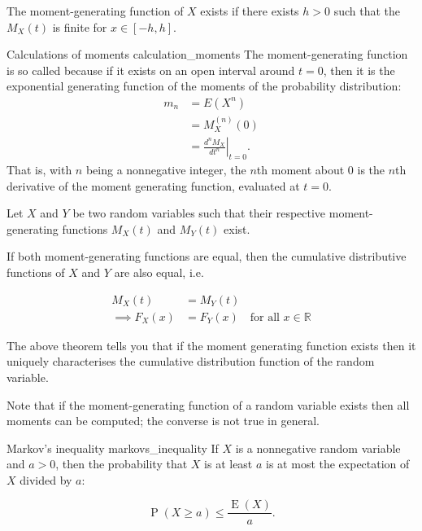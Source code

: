 The moment-generating function of $X$ exists if there exists $h > 0$ such that the $M_X(t)$ is finite for $x \in [-h, h]$.

\begin{lemma}{Calculations of moments \cite{wikipedia_moment_generating_function}}{calculation_moments}
	The moment-generating function is so called because if it exists on an open interval around $t = 0$, then it is the exponential generating function of the moments of the probability distribution:
	\begin{align*}
		m_{n} &= E\left(X^{n}\right) \\
		&= M_{X}^{(n)}(0) \\
		&= \left.{\frac {d^{n}M_{X}}{dt^{n}}}\right|_{t=0} .
	\end{align*}
	That is, with $n$ being a nonnegative integer, the $n$th moment about 0 is the $n$th derivative of the moment generating function, evaluated at $t = 0$.	
\end{lemma}

\begin{theorem}{\cite{math2901_notes}}{}
	Let $X$ and $Y$ be two random variables such that their respective moment-generating functions $M_X(t)$ and $M_Y(t)$ exist.

	If both moment-generating functions are equal, then the cumulative distributive functions of $X$ and $Y$ are also equal, i.e.

	\begin{align*}
		M_X(t) &= M_Y(t) \\
		\implies F_X(x) &= F_Y(x) \quad \text{for all } x \in \mathbb{R}
	\end{align*}
\end{theorem}

The above theorem tells you that if the moment generating
function exists then it uniquely characterises the cumulative
distribution function of the random variable. \cite{math2901_notes}

Note that if the moment-generating function of a random variable exists then all moments can be computed; the converse is not true in general.

\begin{lemma}{Markov's inequality \cite{wikipedia_markovs_inequality}}{markovs_inequality}
	If $X$ is a nonnegative random variable and $a > 0$, then the probability that $X$ is at least $a$ is at most the expectation of $X$ divided by $a$:

	$$ \operatorname {P} (X\geq a)\leq {\frac {\operatorname {E} (X)}{a}} . $$
\end{lemma}

